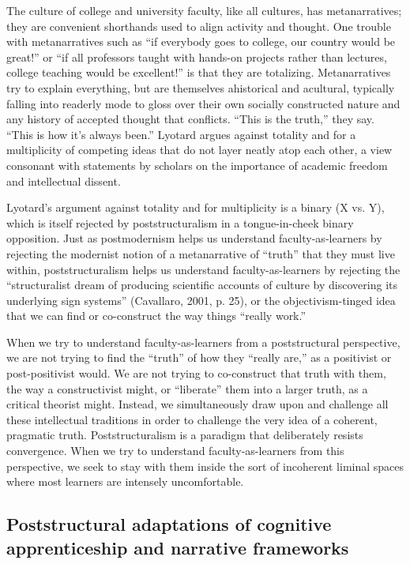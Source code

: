 The culture of college and university faculty, like all cultures, has metanarratives; they are convenient shorthands used to align activity and thought. One trouble with metanarratives such as “if everybody goes to college, our country would be great!” or “if all professors taught with hands-on projects rather than lectures, college teaching would be excellent!” is that they are totalizing. Metanarratives try to explain everything, but are themselves ahistorical and acultural, typically falling into readerly mode to gloss over their own socially constructed nature and any history of accepted thought that conflicts. “This is the truth,” they say. “This is how it’s always been.” Lyotard argues against totality and for a multiplicity of competing ideas that do not layer neatly atop each other, a view consonant with statements by scholars on the importance of academic freedom and intellectual dissent.

Lyotard’s argument against totality and for multiplicity is a binary (X vs. Y), which is itself rejected by poststructuralism in a tongue-in-cheek binary opposition. Just as postmodernism helps us understand faculty-as-learners by rejecting the modernist notion of a metanarrative of “truth” that they must live within, poststructuralism helps us understand faculty-as-learners by rejecting the “structuralist dream of producing scientific accounts of culture by discovering its underlying sign systems” (Cavallaro, 2001, p. 25), or the objectivism-tinged idea that we can find or co-construct the way things “really work.”

When we try to understand faculty-as-learners from a poststructural perspective, we are not trying to find the “truth” of how they “really are,” as a positivist or post-positivist would. We are not trying to co-construct that truth with them, the way a constructivist might, or “liberate” them into a larger truth, as a critical theorist might. Instead, we simultaneously draw upon and challenge all these intellectual traditions in order to challenge the very idea of a coherent, pragmatic truth. Poststructuralism is a paradigm that deliberately resists convergence. When we try to understand faculty-as-learners from this perspective, we seek to stay with them inside the sort of incoherent liminal spaces where most learners are intensely uncomfortable.

\subsection{Poststructural adaptations of cognitive apprenticeship and narrative frameworks}

